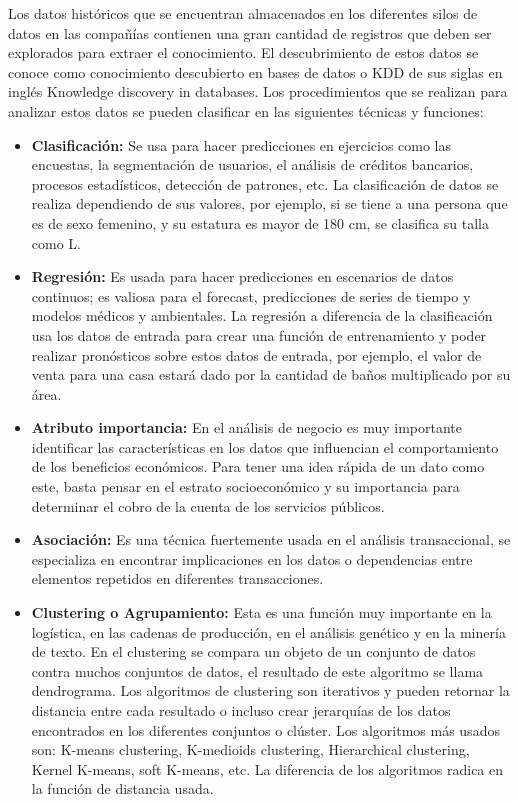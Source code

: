 Los datos históricos que se encuentran almacenados en los diferentes silos de datos en las compañías contienen una gran cantidad de registros que deben ser explorados para extraer el conocimiento. El descubrimiento de estos datos se conoce como conocimiento descubierto en bases de datos o KDD de sus siglas en inglés Knowledge discovery in databases\cite{Hornick2009}. Los procedimientos que se realizan para analizar estos datos se pueden clasificar en las siguientes técnicas y funciones:
\begin{itemize}
\item{ \textbf{Clasificación:}}
 Se usa para hacer predicciones en ejercicios como las encuestas, la segmentación de usuarios, el análisis de créditos bancarios, procesos estadísticos, detección de patrones, etc\cite{Izenman2006}. La clasificación de datos se realiza dependiendo de sus valores, por ejemplo, si se tiene a una persona que es de sexo femenino, y su estatura es mayor de 180 cm,  se clasifica su talla como L.
\item{ \textbf{Regresión:}}
Es usada para hacer predicciones en escenarios de datos continuos; es valiosa para el forecast, predicciones de series de tiempo y modelos médicos y ambientales\cite{Hornick2009}. La regresión a diferencia de la clasificación usa los datos de entrada para crear una función de entrenamiento y poder realizar pronósticos sobre estos datos de entrada\cite{Izenman2006}, por ejemplo, el valor de venta para una casa estará dado por la cantidad de baños multiplicado por su área.
\item{ \textbf{Atributo importancia:}}
En el análisis de negocio es muy importante identificar las características en los datos que influencian el comportamiento de los beneficios económicos\cite{Hornick2009}. Para tener una idea rápida de un dato como este, basta pensar en el estrato socioeconómico y su importancia para determinar el cobro de la cuenta de los servicios públicos.
\item{ \textbf{Asociación:}}
Es una técnica fuertemente usada en el análisis transaccional, se especializa en encontrar implicaciones en los datos o dependencias entre elementos repetidos en diferentes transacciones\cite{Hornick2009}.
\item{ \textbf{Clustering o Agrupamiento:}}
Esta es una función muy importante en la logística, en las cadenas de producción, en el análisis genético y en la minería de texto\cite{Hornick2009}. En el clustering se compara un objeto de un conjunto de datos contra muchos conjuntos de datos, el resultado de este algoritmo se llama dendrograma. Los algoritmos de clustering son iterativos y pueden retornar la distancia entre cada resultado o incluso crear jerarquías de los datos encontrados en los diferentes conjuntos o clúster. Los algoritmos más usados son: K-means clustering, K-medioids clustering, Hierarchical clustering, Kernel K-means, soft K-means, etc. La diferencia de los algoritmos radica en la función de distancia usada\cite{Izenman2006}.

\end{itemize}
